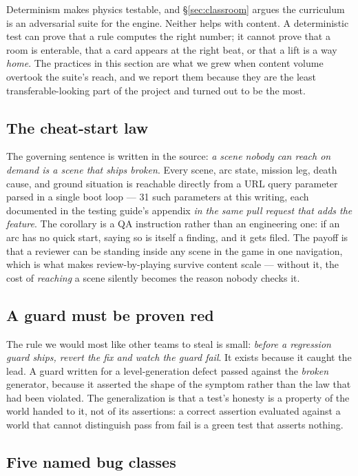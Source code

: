 \documentclass[10pt,twocolumn]{article}
\begin{document}
Determinism makes physics testable, and \S\ref{sec:classroom} argues the curriculum is an
adversarial suite for the engine. Neither helps with content. A deterministic test can prove
that a rule computes the right number; it cannot prove that a room is enterable, that a card
appears at the right beat, or that a lift is a way \emph{home}. The practices in this section
are what we grew when content volume overtook the suite's reach, and we report them because
they are the least transferable-looking part of the project and turned out to be the most.

\subsection{The cheat-start law}

The governing sentence is written in the source: \emph{a scene nobody can reach on demand is a
scene that ships broken}. Every scene, arc state, mission leg, death cause, and ground
situation is reachable directly from a URL query parameter parsed in a single boot loop --- 31
such parameters at this writing, each documented in the testing guide's appendix \emph{in the
same pull request that adds the feature}. The corollary is a QA instruction rather than an
engineering one: if an arc has no quick start, saying so is itself a finding, and it gets
filed. The payoff is that a reviewer can be standing inside any scene in the game in one
navigation, which is what makes review-by-playing survive content scale --- without it, the
cost of \emph{reaching} a scene silently becomes the reason nobody checks it.

\subsection{A guard must be proven red}

The rule we would most like other teams to steal is small: \emph{before a regression guard
ships, revert the fix and watch the guard fail}. It exists because it caught the lead. A
guard written for a level-generation defect passed against the \emph{broken} generator,
because it asserted the shape of the symptom rather than the law that had been violated. The
generalization is that a test's honesty is a property of the world handed to it, not of its
assertions: a correct assertion evaluated against a world that cannot distinguish pass from
fail is a green test that asserts nothing.

\subsection{Five named bug classes}
\end{document}
